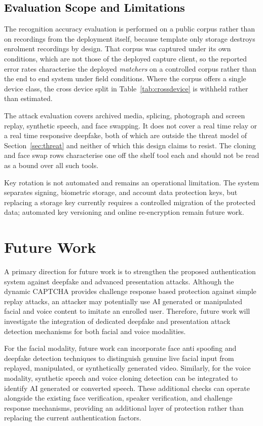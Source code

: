 \documentclass[runningheads]{llncs}
\begin{document}
{\subsection{\textcolor{black}{Evaluation Scope and Limitations}}\label{sec:limits}
The recognition accuracy evaluation is performed on a public corpus rather than on recordings from the deployment itself, because template only storage destroys enrolment recordings by design. That corpus was captured under its own conditions, which are not those of the deployed capture client, so the reported error rates characterise the deployed \emph{matchers} on a controlled corpus rather than the end to end system under field conditions. Where the corpus offers a single device class, the cross device split in Table~\ref{tab:crossdevice} is withheld rather than estimated.

The attack evaluation covers archived media, splicing, photograph and screen replay, synthetic speech, and face swapping. It does not cover a real time relay or a real time responsive deepfake, both of which are outside the threat model of Section~\ref{sec:threat} and neither of which this design claims to resist. The cloning and face swap rows characterise one off the shelf tool each and should not be read as a bound over all such tools.

Key rotation is not automated and remains an operational limitation. The system separates signing, biometric storage, and account data protection keys, but replacing a storage key currently requires a controlled migration of the protected data; automated key versioning and online re-encryption remain future work.

}
\section{Future Work}\label{sec:future}
A primary direction for future work is to strengthen the proposed authentication system against deepfake and advanced presentation attacks. Although the dynamic CAPTCHA provides challenge response based protection against simple replay attacks, an attacker may potentially use AI generated or manipulated facial and voice content to imitate an enrolled user. Therefore, future work will investigate the integration of dedicated deepfake and presentation attack detection mechanisms for both facial and voice modalities.

For the facial modality, future work can incorporate face anti spoofing and deepfake detection techniques to distinguish genuine live facial input from replayed, manipulated, or synthetically generated video. Similarly, for the voice modality, synthetic speech and voice cloning detection can be integrated to identify AI generated or converted speech. These additional checks can operate alongside the existing face verification, speaker verification, and challenge response mechanisms, providing an additional layer of protection rather than replacing the current authentication factors.
\end{document}
